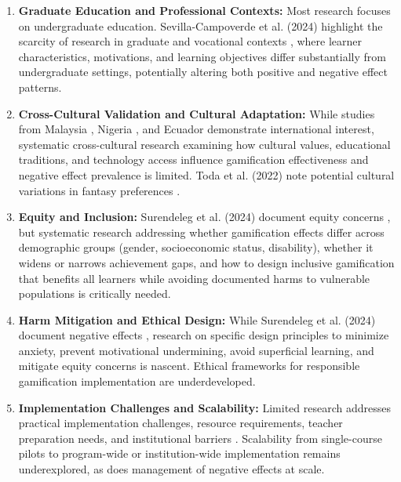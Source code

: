\documentclass[12pt,a4paper]{article}
\begin{document}
\begin{enumerate}
    \item \textbf{Graduate Education and Professional Contexts:} Most research focuses on undergraduate education. Sevilla-Campoverde et al. (2024) highlight the scarcity of research in graduate and vocational contexts \parencite{sevilla2024}, where learner characteristics, motivations, and learning objectives differ substantially from undergraduate settings, potentially altering both positive and negative effect patterns.
    
    \item \textbf{Cross-Cultural Validation and Cultural Adaptation:} While studies from Malaysia \parencite{dahri2024}, Nigeria \parencite{ojonuba2023}, and Ecuador \parencite{sevilla2024} demonstrate international interest, systematic cross-cultural research examining how cultural values, educational traditions, and technology access influence gamification effectiveness and negative effect prevalence is limited. Toda et al. (2022) note potential cultural variations in fantasy preferences \parencite{toda2022}.
    
    \item \textbf{Equity and Inclusion:} Surendeleg et al. (2024) document equity concerns \parencite{surendeleg2024}, but systematic research addressing whether gamification effects differ across demographic groups (gender, socioeconomic status, disability), whether it widens or narrows achievement gaps, and how to design inclusive gamification that benefits all learners while avoiding documented harms to vulnerable populations is critically needed.
    
    \item \textbf{Harm Mitigation and Ethical Design:} While Surendeleg et al. (2024) document negative effects \parencite{surendeleg2024}, research on specific design principles to minimize anxiety, prevent motivational undermining, avoid superficial learning, and mitigate equity concerns is nascent. Ethical frameworks for responsible gamification implementation are underdeveloped.
    
    \item \textbf{Implementation Challenges and Scalability:} Limited research addresses practical implementation challenges, resource requirements, teacher preparation needs, and institutional barriers \parencite{rodriguez2025}. Scalability from single-course pilots to program-wide or institution-wide implementation remains underexplored, as does management of negative effects at scale.
    

\end{enumerate}
\end{document}
